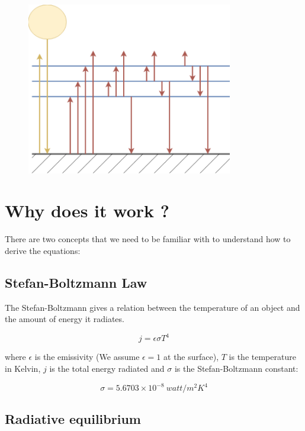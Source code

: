 \documentclass[a4paper,12pt]{article}
\begin{document}
\begin{figure}[h]
  \centering
  \includegraphics[width=90mm]{Model}
  \caption{}
  \label{fig:model}
\end{figure}

\section*{Why does it work ?}

There are two concepts that we need to be familiar with to understand how to derive the equations:



\subsection*{Stefan-Boltzmann Law}

The Stefan-Boltzmann gives a relation between the temperature of an object and the amount of energy it radiates.

\begin{equation}
    j=\epsilon \sigma T^4
\end{equation}

where $\epsilon$ is the emissivity (We assume $\epsilon = 1$ at the surface), $T$ is the temperature in Kelvin, $j$ is the total energy radiated and $\sigma$ is the Stefan-Boltzmann constant:

\begin{equation*}
    \sigma=5.6703 \times 10^{-8}\ watt/m^2 K^4
\end{equation*}

\subsection*{Radiative equilibrium}
\end{document}
